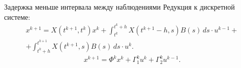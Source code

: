         \begin{frame}{Задержка меньше интервала между наблюдениями}
                Редукция к дискретной системе:
                \begin{multline*}
x^{k+1} = X(t^{k+1},t^k)x^k
+
\int_{t^k}^{t^{k} + h} X(t^{k+1} - h,s)B(s)\,ds\cdot u^{k-1}
+\\+
\int_{t^{k} + h}^{t^{k+1}} X(t^{k+1},s)B(s)\,ds\cdot u^{k}.
\end{multline*}
\begin{equation*}
        x^{k+1} = \Phi^k x^k + \Gamma_1^k u^{k} + \Gamma_2^k u^{k-1}.
\end{equation*}
                \begin{adjustbox}{max totalsize={0.9\textwidth}{.4\textheight}, center}
\centering
\begin{tikzpicture}[x=0.75pt,y=0.75pt,yscale=-1,xscale=1]


\end{tikzpicture}
\end{adjustbox}
\end{frame}
